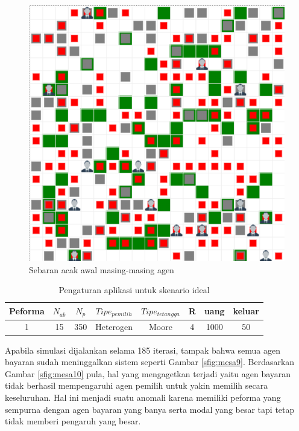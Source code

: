 \begin{figure}[H]
\centering
\includegraphics[width=0.8\linewidth]{images/ch03/mesa8}
\caption{Sebaran acak awal masing-masing agen}
\label{fig:mesa8}
\end{figure}


\begin{table}[H]
\centering
\caption{Pengaturan aplikasi untuk skenario ideal}
\begin{tabular}{cccccccc}
	\hline
	Peforma & $N_{ab}$ & $N_{p}$ & $Tipe_{pemilih}$ & $Tipe_{tetangga}$ & R & uang & keluar \\
	\hline
	1 & 15 & 350 & Heterogen & Moore & 4 & 1000 & 50\\
	\hline
\end{tabular}
\label{tab:pengaturanoptimis}
\end{table}

Apabila simulasi dijalankan selama 185 iterasi, tampak bahwa semua agen bayaran sudah meninggalkan sistem seperti Gambar \ref{sfig:mesa9}. Berdasarkan Gambar \ref{sfig:mesa10} pula, hal yang mengagetkan terjadi yaitu agen bayaran tidak berhasil mempengaruhi agen pemilih untuk yakin memilih secara keseluruhan. Hal ini menjadi suatu anomali karena memiliki peforma yang sempurna dengan agen bayaran yang banya serta modal yang besar tapi tetap tidak memberi pengaruh yang besar.

